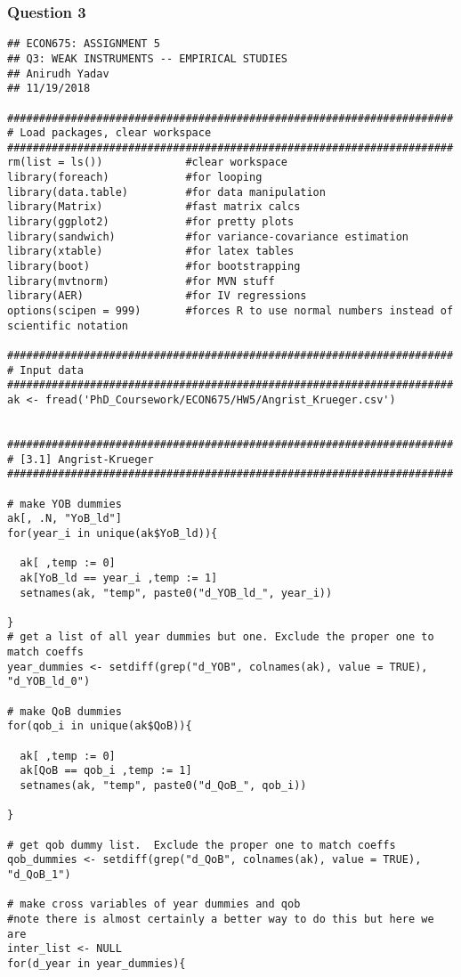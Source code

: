\documentclass[12pt]{article}
\begin{document}
\subsubsection{Question 3}
\begin{verbatim}
## ECON675: ASSIGNMENT 5
## Q3: WEAK INSTRUMENTS -- EMPIRICAL STUDIES
## Anirudh Yadav 
## 11/19/2018

######################################################################
# Load packages, clear workspace
######################################################################
rm(list = ls())             #clear workspace
library(foreach)            #for looping
library(data.table)         #for data manipulation
library(Matrix)             #fast matrix calcs
library(ggplot2)            #for pretty plots
library(sandwich)           #for variance-covariance estimation 
library(xtable)             #for latex tables
library(boot)               #for bootstrapping
library(mvtnorm)            #for MVN stuff
library(AER)                #for IV regressions
options(scipen = 999)       #forces R to use normal numbers instead of scientific notation

######################################################################
# Input data
###################################################################### 
ak <- fread('PhD_Coursework/ECON675/HW5/Angrist_Krueger.csv')


######################################################################
# [3.1] Angrist-Krueger
######################################################################

# make YOB dummies
ak[, .N, "YoB_ld"]
for(year_i in unique(ak$YoB_ld)){
  
  ak[ ,temp := 0]
  ak[YoB_ld == year_i ,temp := 1]
  setnames(ak, "temp", paste0("d_YOB_ld_", year_i))
  
}
# get a list of all year dummies but one. Exclude the proper one to match coeffs 
year_dummies <- setdiff(grep("d_YOB", colnames(ak), value = TRUE), "d_YOB_ld_0")

# make QoB dummies 
for(qob_i in unique(ak$QoB)){
  
  ak[ ,temp := 0]
  ak[QoB == qob_i ,temp := 1]
  setnames(ak, "temp", paste0("d_QoB_", qob_i))
  
}

# get qob dummy list.  Exclude the proper one to match coeffs 
qob_dummies <- setdiff(grep("d_QoB", colnames(ak), value = TRUE), "d_QoB_1")

# make cross variables of year dummies and qob
#note there is almost certainly a better way to do this but here we are 
inter_list <- NULL
for(d_year in year_dummies){
  

\end{verbatim}
\end{document}
